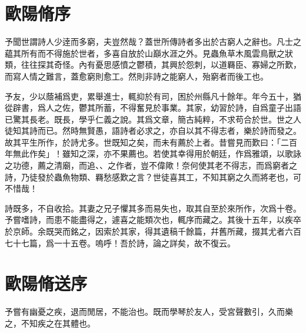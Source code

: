 \section[梅聖俞詩集序\quad{\small 歐陽脩}]{{\normalsize 歐陽脩}\quad {}序}
予聞世謂詩人少逹而多窮，夫豈然哉？蓋世所傳詩者多出於古窮人之辭也。凡士之藴其所有而不得施於世者，多喜自放於山巔水涯之外。見蟲魚草木風雲鳥獸之狀類，往往探其奇怪。內有憂思感憤之鬱積，其興於怨刺，以道羇臣、寡婦之所歎，而寫人情之難言，蓋愈窮則愈工。然則非詩之能窮人，殆窮者而後工也。

予友，少以蔭補爲吏，累舉進士，輒抑於有司，困於州縣凡十餘年。年今五十，猶從辟書，爲人之佐，鬱其所蓄，不得奮見於事業。其家，幼習於詩，自爲童子出語已驚其長老。既長，學乎仁義之說。其爲文章，簡古純粹，不求苟合於世。世之人徒知其詩而已。然時無賢愚，語詩者必求之，亦自以其不得志者，樂於詩而發之。故其平生所作，於詩尤多。世既知之矣，而未有薦於上者。昔嘗見而歎曰：「二百年無此作矣」！雖知之深，亦不果薦也。若使其幸得用於朝廷，作爲雅頌，以歌詠之功德，薦之清廟，而追、、之作者，豈不偉歟！奈何使其老不得志，而爲窮者之詩，乃徒發於蟲魚物類、羇愁感歎之言？世徒喜其工，不知其窮之久而將老也，可不惜哉！

詩既多，不自收拾。其妻之兄子懼其多而易失也，取其自至於\allowbreak 來所作，次爲十卷。予嘗嗜詩，而患不能盡得之，遽喜之能類次也，輒序而藏之。其後十五年，以疾卒於京師。余既哭而銘之，因索於其家，得其遺稿千餘篇，幷舊所藏，掇其尤者六百七十七篇，爲一十五卷。嗚呼！吾於詩，論之詳矣，故不復云。%

\theendnotes

\section[送楊寘序\quad{\small 歐陽脩}]{{\normalsize 歐陽脩}\quad 送序}
予嘗有幽憂之疾，退而閒居，不能治也。既而學琴於友人，受宮聲數引，久而樂之，不知疾之在{其}體也。%

